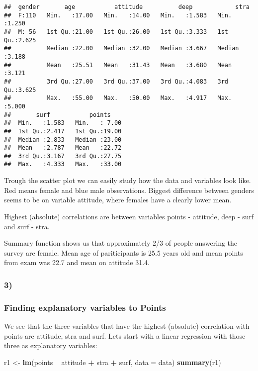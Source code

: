 \documentclass[]{article}
\newenvironment{Shaded}{\begin{snugshade}}{\end{snugshade}}
\newcommand{\KeywordTok}[1]{\textcolor[rgb]{0.13,0.29,0.53}{\textbf{#1}}}
\newcommand{\DataTypeTok}[1]{\textcolor[rgb]{0.13,0.29,0.53}{#1}}
\newcommand{\StringTok}[1]{\textcolor[rgb]{0.31,0.60,0.02}{#1}}
\newcommand{\OperatorTok}[1]{\textcolor[rgb]{0.81,0.36,0.00}{\textbf{#1}}}
\newcommand{\NormalTok}[1]{#1}
\begin{document}
\begin{verbatim}
##  gender       age           attitude          deep            stra      
##  F:110   Min.   :17.00   Min.   :14.00   Min.   :1.583   Min.   :1.250  
##  M: 56   1st Qu.:21.00   1st Qu.:26.00   1st Qu.:3.333   1st Qu.:2.625  
##          Median :22.00   Median :32.00   Median :3.667   Median :3.188  
##          Mean   :25.51   Mean   :31.43   Mean   :3.680   Mean   :3.121  
##          3rd Qu.:27.00   3rd Qu.:37.00   3rd Qu.:4.083   3rd Qu.:3.625  
##          Max.   :55.00   Max.   :50.00   Max.   :4.917   Max.   :5.000  
##       surf           points     
##  Min.   :1.583   Min.   : 7.00  
##  1st Qu.:2.417   1st Qu.:19.00  
##  Median :2.833   Median :23.00  
##  Mean   :2.787   Mean   :22.72  
##  3rd Qu.:3.167   3rd Qu.:27.75  
##  Max.   :4.333   Max.   :33.00
\end{verbatim}

Trough the scatter plot we can easily study how the data and variables
look like. Red means female and blue male observations. Biggest
difference between genders seems to be on variable attitude, where
females have a clearly lower mean.

Highest (absolute) correlations are between variables points - attitude,
deep - surf and surf - stra.

Summary function shows us that approximately 2/3 of people answering the
survey are female. Mean age of pariticipants is 25.5 years old and mean
points from exam was 22.7 and mean on attitude 31.4.

\subsubsection{3)}\label{section-2}

\subsubsection{Finding explanatory variables to
Points}\label{finding-explanatory-variables-to-points}

We see that the three variables that have the highest (absolute)
correlation with points are attitude, stra and surf. Lets start with a
linear regression with those three as explanatory variables:

\begin{Shaded}
\begin{Highlighting}[]
\NormalTok{r1 <-}\StringTok{ }\KeywordTok{lm}\NormalTok{(points }\OperatorTok{~}\StringTok{ }\NormalTok{attitude }\OperatorTok{+}\StringTok{ }\NormalTok{stra }\OperatorTok{+}\StringTok{ }\NormalTok{surf, }\DataTypeTok{data =}\NormalTok{ data)}
\KeywordTok{summary}\NormalTok{(r1)}
\end{Highlighting}
\end{Shaded}
\end{document}
